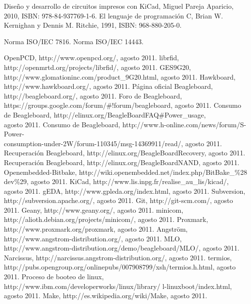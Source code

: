 \begin{thebibliography}{200}
 Diseño y desarrollo de circuitos impresos con KiCad, Miguel Pareja Aparicio, 2010, ISBN: 978-84-937769-1-6.
\bibitem{} El lenguaje de programación C, Brian W. Kernighan y Dennis M. Ritchie, 1991, ISBN: 968-880-205-0.

 Norma ISO/IEC 7816.
 Norma ISO/IEC 14443.


 OpenPCD, http://www.openpcd.org/, agosto 2011.
 librfid, http://openmrtd.org/projects/librfid/, agosto 2011.
 GES9G20, http://www.glomationinc.com/product\_9G20.html, agosto 2011.
 Hawkboard, http://www.hawkboard.org/, agosto 2011.
 Página oficial Beagleboard, http://beagleboard.org/, agosto 2011.
 Foro de Beagleboard, https://groups.google.com/forum/\#!forum/beagleboard, agosto 2011.
 Consumo de Beagleboard, http://elinux.org/BeagleBoardFAQ\#Power\_usage, \\
agosto 2011.
 Consumo de Beagleboard, http://www.h-online.com/news/forum/S-Power-\\
consumption-under-2W/forum-110345/msg-14369911/read/, agosto 2011.
 Recuperación Beagleboard, http://elinux.org/BeagleBoardRecovery, agosto 2011.
 Recuperación Beagleboard, http://elinux.org/BeagleBoardNAND, agosto 2011.
 Openembedded-Bitbake, http://wiki.openembedded.net/index.php/BitBake\_\%28
dev\%29, agosto 2011.
 KiCad, http://www.lis.inpg.fr/realise\_au\_lis/kicad/, agosto 2011.
 gEDA, http://www.gpleda.org/index.html, agosto 2011.
 Subversion, http://subversion.apache.org/, agosto 2011.
 Git, http://git-scm.com/, agosto 2011.
 Geany, http://www.geany.org/, agosto 2011.
 minicom, http://alioth.debian.org/projects/minicom/, agosto 2011.
 Proxmark, http://www.proxmark.org/proxmark, agosto 2011.
 Angström, http://www.angstrom-distribution.org/, agosto 2011.
 MLO, http://www.angstrom-distribution.org/demo/beagleboard/MLO/, agosto 2011.
 Narcissus, http://narcissus.angstrom-distribution.org/, agosto 2011.
 termios, http://pubs.opengroup.org/onlinepubs/007908799/xsh/termios.h.html, agosto 2011.
 Proceso de booteo de linux, http://www.ibm.com/developerworks/linux/library/
l-linuxboot/index.html, agosto 2011.
 Make, http://es.wikipedia.org/wiki/Make, agosto 2011.

\end{thebibliography}

